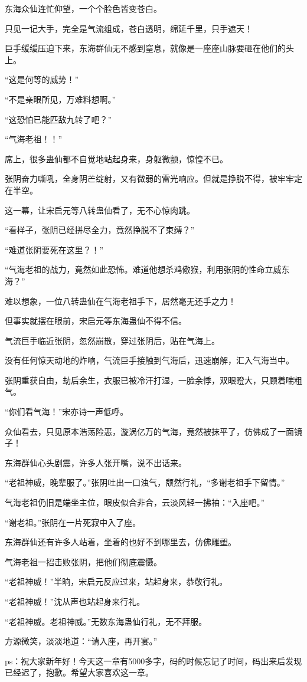 \begin{this_body}
东海众仙连忙仰望，一个个脸色皆变苍白。

只见一记大手，完全是气流组成，苍白透明，绵延千里，只手遮天！

巨手缓缓压迫下来，东海群仙无不感到窒息，就像是一座座山脉要砸在他们的头上。

“这是何等的威势！”

“不是亲眼所见，万难料想啊。”

“这恐怕已能匹敌九转了吧？”

“气海老祖！！”

席上，很多蛊仙都不自觉地站起身来，身躯微颤，惊惶不已。

张阴奋力嘶吼，全身阴芒绽射，又有微弱的雷光响应。但就是挣脱不得，被牢牢定在半空。

这一幕，让宋启元等八转蛊仙看了，无不心惊肉跳。

“看样子，张阴已经拼尽全力，竟然挣脱不了束缚？”

“难道张阴要死在这里？！”

“气海老祖的战力，竟然如此恐怖。难道他想杀鸡儆猴，利用张阴的性命立威东海？”

难以想象，一位八转蛊仙在气海老祖手下，居然毫无还手之力！

但事实就摆在眼前，宋启元等东海蛊仙不得不信。

气流巨手临近张阴，忽然崩散，穿过张阴后，贴在气海上。

没有任何惊天动地的炸响，气流巨手接触到气海后，迅速崩解，汇入气海当中。

张阴重获自由，劫后余生，衣服已被冷汗打湿，一脸余悸，双眼瞪大，只顾着喘粗气。

“你们看气海！”宋亦诗一声低呼。

众仙看去，只见原本浩荡险恶，漩涡亿万的气海，竟然被抹平了，仿佛成了一面镜子！

东海群仙心头剧震，许多人张开嘴，说不出话来。

“老祖神威，晚辈服了。”张阴吐出一口浊气，颓然行礼，“多谢老祖手下留情。”

气海老祖仍旧是端坐主位，眼皮似合非合，云淡风轻一拂袖：“入座吧。”

“谢老祖。”张阴在一片死寂中入了座。

东海群仙还有许多人站着，坐着的也好不到哪里去，仿佛雕塑。

气海老祖一招击败张阴，把他们彻底震慑。

“老祖神威！”半晌，宋启元反应过来，站起身来，恭敬行礼。

“老祖神威！”沈从声也站起身来行礼。

“老祖神威。老祖神威。”无数东海蛊仙行礼，无不拜服。

方源微笑，淡淡地道：“请入座，再开宴。”

ps：祝大家新年好！今天这一章有5000多字，码的时候忘记了时间，码出来后发现已经迟了，抱歉。希望大家喜欢这一章。

\end{this_body}

